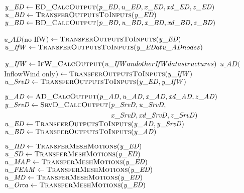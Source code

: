 \documentclass[10pt,letterpaper,oneside,notitlepage]{article}
\begin{document}
\begin{algorithmic}[1]

\State
   \State $\mathit{y\_ED} \gets \Call{ED\_CalcOutput}{\mathit{p\_ED},\mathit{u\_ED},\mathit{x\_ED},\mathit{xd\_ED},\mathit{z\_ED}}$
   \State $\mathit{u\_BD}  \gets \Call{TransferOutputsToInputs}{\mathit{y\_ED}}$
   \State $\mathit{y\_BD} \gets \Call{BD\_CalcOutput}{\mathit{p\_BD},\mathit{u\_BD},\mathit{x\_BD},\mathit{xd\_BD},\mathit{z\_BD}}$

\State
   \State $\mathit{u\_AD}($no IfW$)  \gets \Call{TransferOutputsToInputs}{\mathit{y\_ED}}$
   \State $\mathit{u\_IfW} \gets \Call{TransferOutputsToInputs}{\mathit{y\_ED} at \mathit{u\_AD} nodes}$

\State
   \State $\mathit{y\_IfW} \gets \Call{IfW\_CalcOutput}{\mathit{u\_IfW} and other \mathit{IfW} data structures}$
   \State $\mathit{u\_AD}($InflowWind only$) \gets \Call{TransferOutputsToInputs}{\mathit{y\_IfW}}$
   \State $\mathit{u\_SrvD} \gets \Call{TransferOutputsToInputs}{\mathit{y\_ED},\mathit{y\_IfW}}$

\State
   \State $\mathit{y\_AD} \gets \Call{AD\_CalcOutput}{\mathit{p\_AD},\mathit{u\_AD},\mathit{x\_AD},\mathit{xd\_AD},\mathit{z\_AD}}$
   \State $\mathit{y\_SrvD} \gets \Call{SrvD\_CalcOutput}{}( \!
            \begin{aligned}[t]
                               & \mathit{p\_SrvD},\mathit{u\_SrvD}, \\
                               & \mathit{x\_SrvD},\mathit{xd\_SrvD},\mathit{z\_SrvD}) \\
            \end{aligned}$
   \State $\mathit{u\_ED} \gets \Call{TransferOutputsToInputs}{\mathit{y\_AD},\mathit{y\_SrvD}}$
   \State $\mathit{u\_BD} \gets \Call{TransferOutputsToInputs}{\mathit{y\_AD}}$

\State

   \State $\mathit{u\_HD}   \gets \Call{TransferMeshMotions}{\mathit{y\_ED}}$
   \State $\mathit{u\_SD}   \gets \Call{TransferMeshMotions}{\mathit{y\_ED}}$
   \State $\mathit{u\_MAP}  \gets \Call{TransferMeshMotions}{\mathit{y\_ED}}$
   \State $\mathit{u\_FEAM} \gets \Call{TransferMeshMotions}{\mathit{y\_ED}}$
   \State $\mathit{u\_MD}   \gets \Call{TransferMeshMotions}{\mathit{y\_ED}}$
   \State $\mathit{u\_Orca} \gets \Call{TransferMeshMotions}{\mathit{y\_ED}}$


\end{algorithmic}
\end{document}
